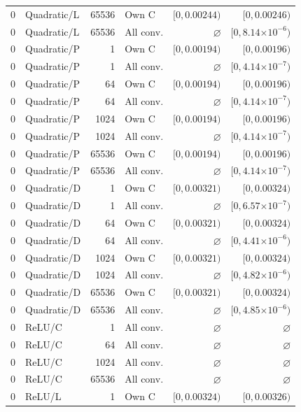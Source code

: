 \begin{longtable}{llrlrr}
0 & Quadratic/L & 65536 & Own C & $[0, 0.00244)$ & $[0, 0.00246)$ \\
0 & Quadratic/L & 65536 & All conv. & $\varnothing$ & $[0, 8.14\mathord{\times}10^{-6})$ \\
0 & Quadratic/P & 1 & Own C & $[0, 0.00194)$ & $[0, 0.00196)$ \\
0 & Quadratic/P & 1 & All conv. & $\varnothing$ & $[0, 4.14\mathord{\times}10^{-7})$ \\
0 & Quadratic/P & 64 & Own C & $[0, 0.00194)$ & $[0, 0.00196)$ \\
0 & Quadratic/P & 64 & All conv. & $\varnothing$ & $[0, 4.14\mathord{\times}10^{-7})$ \\
0 & Quadratic/P & 1024 & Own C & $[0, 0.00194)$ & $[0, 0.00196)$ \\
0 & Quadratic/P & 1024 & All conv. & $\varnothing$ & $[0, 4.14\mathord{\times}10^{-7})$ \\
0 & Quadratic/P & 65536 & Own C & $[0, 0.00194)$ & $[0, 0.00196)$ \\
0 & Quadratic/P & 65536 & All conv. & $\varnothing$ & $[0, 4.14\mathord{\times}10^{-7})$ \\
0 & Quadratic/D & 1 & Own C & $[0, 0.00321)$ & $[0, 0.00324)$ \\
0 & Quadratic/D & 1 & All conv. & $\varnothing$ & $[0, 6.57\mathord{\times}10^{-7})$ \\
0 & Quadratic/D & 64 & Own C & $[0, 0.00321)$ & $[0, 0.00324)$ \\
0 & Quadratic/D & 64 & All conv. & $\varnothing$ & $[0, 4.41\mathord{\times}10^{-6})$ \\
0 & Quadratic/D & 1024 & Own C & $[0, 0.00321)$ & $[0, 0.00324)$ \\
0 & Quadratic/D & 1024 & All conv. & $\varnothing$ & $[0, 4.82\mathord{\times}10^{-6})$ \\
0 & Quadratic/D & 65536 & Own C & $[0, 0.00321)$ & $[0, 0.00324)$ \\
0 & Quadratic/D & 65536 & All conv. & $\varnothing$ & $[0, 4.85\mathord{\times}10^{-6})$ \\
0 & ReLU/C & 1 & All conv. & $\varnothing$ & $\varnothing$ \\
0 & ReLU/C & 64 & All conv. & $\varnothing$ & $\varnothing$ \\
0 & ReLU/C & 1024 & All conv. & $\varnothing$ & $\varnothing$ \\
0 & ReLU/C & 65536 & All conv. & $\varnothing$ & $\varnothing$ \\
0 & ReLU/L & 1 & Own C & $[0, 0.00324)$ & $[0, 0.00326)$ \\

\end{longtable}
